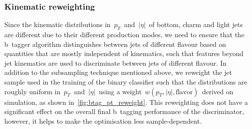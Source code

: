 \subsubsection{Kinematic reweighting}
Since the kinematic distributions in~$p_T$~and~$|\eta|$~of bottom, charm and light jets are different due to their different production modes, we need to ensure that the b~tagger algorithm distinguishes between jets of different flavour based on quantities that are mostly independent of kinematics, such that features beyond jet kinematics are used to discriminate between jets of different flavour. In addition to the subsampling technique mentioned above, we reweight the jet sample used in the training of the binary classifier such that the distributions are roughly uniform in~$p_T$~and~$|\eta|$~using a weight~$w(p_T,|\eta|,\mathrm{flavor})$~derived on simulation, as shown in~\cref{fig:btag_pt_reweight}. This reweighting does not have a significant effect on the overall final b~tagging performance of the discriminator, however, it helps to make the optimisation less sample-dependent.

